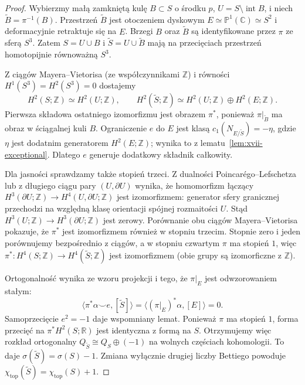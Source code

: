 \begin{proof}
Wybierzmy małą zamkniętą kulę $B\subset S$ o środku $p$,
$U=S\setminus\operatorname{int}B$, i niech
$\widetilde B=\pi^{-1}(B)$. Przestrzeń $\widetilde B$ jest
otoczeniem dyskowym $E\simeq\mathbb P^1(\mathbb C)\simeq S^2$
i deformacyjnie retraktuje się na $E$. Brzegi $B$ oraz
$\widetilde B$ są identyfikowane przez $\pi$ ze sferą $S^3$.
Zatem $S=U\cup B$ i $\widetilde S=U\cup\widetilde B$
mają na przecięciach przestrzeń homotopijnie równoważną $S^3$.

Z ciągów Mayera--Vietorisa (ze współczynnikami $\mathbb Z$)
i równości $H^1(S^3)=H^2(S^3)=0$ dostajemy
\[
 H^2(S;\mathbb Z)\simeq H^2(U;\mathbb Z),\qquad
 H^2(\widetilde S;\mathbb Z)
 \simeq H^2(U;\mathbb Z)\oplus H^2(E;\mathbb Z).
\]
Pierwsza składowa ostatniego izomorfizmu jest obrazem $\pi^*$,
ponieważ $\pi|_{\widetilde B}$ ma obraz w ściągalnej kuli $B$.
Ograniczenie $e$ do $E$ jest klasą
$c_1(N_{E/\widetilde S})=-\eta$, gdzie
$\eta$ jest dodatnim generatorem $H^2(E;\mathbb Z)$;
wynika to z lematu~\ref{lem:xvii-exceptional}.
Dlatego $e$ generuje dodatkowy składnik całkowity.

Dla jasności sprawdzamy także stopień trzeci.
Z dualności Poincarégo--Lefschetza lub z długiego ciągu pary
$(U,\partial U)$ wynika, że homomorfizm łączący
$H^3(\partial U;\mathbb Z)\to H^4(U,\partial U;\mathbb Z)$
jest izomorfizmem: generator sfery granicznej przechodzi
na względną klasę orientacji spójnej rozmaitości $U$.
Stąd $H^3(U;\mathbb Z)\to H^3(\partial U;\mathbb Z)$
jest zerowy. Porównanie obu ciągów Mayera--Vietorisa
pokazuje, że $\pi^*$ jest izomorfizmem również w stopniu trzecim.
Stopnie zero i jeden porównujemy bezpośrednio z ciągów,
a w stopniu czwartym $\pi$ ma stopień $1$, więc
$\pi^*:H^4(S;\mathbb Z)\to H^4(\widetilde S;\mathbb Z)$
jest izomorfizmem (obie grupy są izomorficzne z $\mathbb Z$).

Ortogonalność wynika ze wzoru projekcji i tego, że
$\pi|_E$ jest odwzorowaniem stałym:
\[
 \langle\pi^*\alpha\smile e,[\widetilde S]\rangle
 =\langle (\pi|_E)^*\alpha,[E]\rangle=0.
\]
Samoprzecięcie $e^2=-1$ daje wspomniany lemat.
Ponieważ $\pi$ ma stopień $1$, forma przecięć na
$\pi^*H^2(S;\mathbb R)$ jest identyczna z formą na $S$.
Otrzymujemy więc rozkład ortogonalny
$Q_{\widetilde S}\cong Q_S\oplus(-1)$ na wolnych częściach
kohomologii. To daje $\sigma(\widetilde S)=\sigma(S)-1$.
Zmiana wyłącznie drugiej liczby Bettiego powoduje
$\chi_{\mathrm{top}}(\widetilde S)=\chi_{\mathrm{top}}(S)+1$.
\end{proof}
\fi
